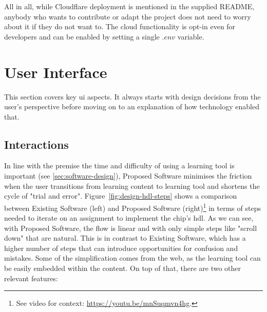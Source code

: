 All in all, while Cloudflare deployment is mentioned in the supplied README, anybody who wants to contribute or adapt the project does not need to worry about it if they do not want to.
The cloud functionality is opt-in even for developers and can be enabled by setting a single $.env$ variable.

\section{User Interface}

This section covers key \gls{ui} aspects.
It always starts with design decisions from the user's perspective before moving on to an explanation of how technology enabled that.

\subsection{Interactions}

In line with the premise the time and difficulty of using a learning tool is important (see \autoref{sec:software-design}), Proposed Software minimises the friction when the user transitions from learning content to learning tool and shortens the cycle of "trial and error".
Figure~\ref{fig:design-hdl-steps} shows a comparison between Existing Software (left) and Proposed Software (right)\footnote{See video for context: \url{https://youtu.be/mnSuqmvn4hg}.} in terms of steps needed to iterate on an assignment to implement the chip's \gls{hdl}.
As we can see, with Proposed Software, the flow is linear and with only simple steps like "scroll down" that are natural.
This is in contrast to Existing Software, which has a higher number of steps that can introduce opportunities for confusion and mistakes.
Some of the simplification comes from the web, as the learning tool can be easily embedded within the content.
On top of that, there are two other relevant features:

